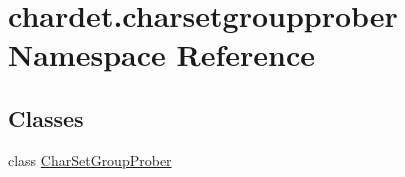 \hypertarget{namespacechardet_1_1charsetgroupprober}{}\section{chardet.\+charsetgroupprober Namespace Reference}
\label{namespacechardet_1_1charsetgroupprober}
\subsection*{Classes}
\begin{DoxyCompactItemize}
\item 
class \hyperlink{classchardet_1_1charsetgroupprober_1_1_char_set_group_prober}{Char\+Set\+Group\+Prober}
\end{DoxyCompactItemize}
